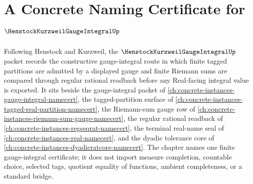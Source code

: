 \chapter{A Concrete Naming Certificate for $\HenstockKurzweilGaugeIntegralUp$}
\label{ch:concrete-instances-henstock-kurzweil-gauge-integral-namecert}

Following Henstock and Kurzweil, the $\HenstockKurzweilGaugeIntegralUp$ packet records the constructive gauge-integral route in which finite tagged partitions are admitted by a displayed gauge and finite Riemann sums are compared through regular rational readback before any Real-facing integral value is exported. It sits beside the gauge-integral packet of \autoref{ch:concrete-instances-gauge-integral-namecert}, the tagged-partition surface of \autoref{ch:concrete-instances-tagged-real-partition-namecert}, the Riemann-sum gauge row of \autoref{ch:concrete-instances-riemann-sum-gauge-namecert}, the regular rational readback of \autoref{ch:concrete-instances-regseqrat-namecert}, the terminal real-name seal of \autoref{ch:concrete-instances-real-namecert}, and the dyadic tolerance core of \autoref{ch:concrete-instances-dyadicratcore-namecert}. The chapter names one finite gauge-integral certificate; it does not import measure completion, countable choice, selected tags, quotient equality of functions, ambient completeness, or a standard bridge.

